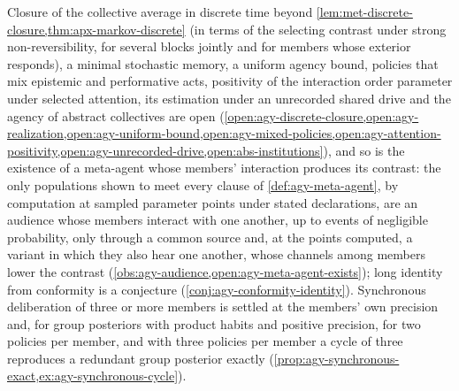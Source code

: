 Closure of the collective average in discrete time beyond \cref{lem:met-discrete-closure,thm:apx-markov-discrete} (in terms of the selecting contrast under strong non-reversibility, for several blocks jointly and for members whose exterior responds), a minimal stochastic memory, a uniform agency bound, policies that mix epistemic and performative acts, positivity of the interaction order parameter under selected attention, its estimation under an unrecorded shared drive and the agency of abstract collectives are open (\cref{open:agy-discrete-closure,open:agy-realization,open:agy-uniform-bound,open:agy-mixed-policies,open:agy-attention-positivity,open:agy-unrecorded-drive,open:abs-institutions}), and so is the existence of a meta-agent whose members' interaction produces its contrast: the only populations shown to meet every clause of \cref{def:agy-meta-agent}, by computation at sampled parameter points under stated declarations, are an audience whose members interact with one another, up to events of negligible probability, only through a common source and, at the points computed, a variant in which they also hear one another, whose channels among members lower the contrast (\cref{obs:agy-audience,open:agy-meta-agent-exists}); long identity from conformity is a conjecture (\cref{conj:agy-conformity-identity}). Synchronous deliberation of three or more members is settled at the members' own precision and, for group posteriors with product habits and positive precision, for two policies per member, and with three policies per member a cycle of three reproduces a redundant group posterior exactly (\cref{prop:agy-synchronous-exact,ex:agy-synchronous-cycle}).

